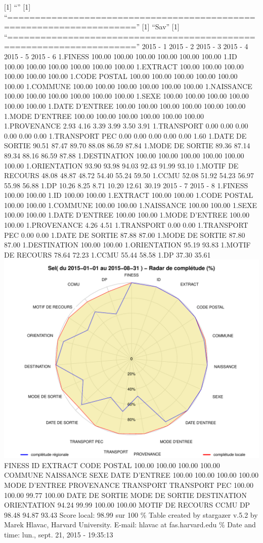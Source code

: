 \documentclass[]{article}
\begin{document}
{[}1{]} ``'' {[}1{]}
``=====================================================================''
{[}1{]} ``Sav'' {[}1{]}
``=====================================================================''
2015 - 1 2015 - 2 2015 - 3 2015 - 4 2015 - 5 2015 - 6 1.FINESS 100.00
100.00 100.00 100.00 100.00 100.00 1.ID 100.00 100.00 100.00 100.00
100.00 100.00 1.EXTRACT 100.00 100.00 100.00 100.00 100.00 100.00 1.CODE
POSTAL 100.00 100.00 100.00 100.00 100.00 100.00 1.COMMUNE 100.00 100.00
100.00 100.00 100.00 100.00 1.NAISSANCE 100.00 100.00 100.00 100.00
100.00 100.00 1.SEXE 100.00 100.00 100.00 100.00 100.00 100.00 1.DATE
D'ENTREE 100.00 100.00 100.00 100.00 100.00 100.00 1.MODE D'ENTREE
100.00 100.00 100.00 100.00 100.00 100.00 1.PROVENANCE 2.93 4.16 3.39
3.99 3.50 3.91 1.TRANSPORT 0.00 0.00 0.00 0.00 0.00 0.00 1.TRANSPORT PEC
0.00 0.00 0.00 0.00 0.00 1.60 1.DATE DE SORTIE 90.51 87.47 89.70 88.08
86.59 87.84 1.MODE DE SORTIE 89.36 87.14 89.34 88.16 86.59 87.88
1.DESTINATION 100.00 100.00 100.00 100.00 100.00 100.00 1.ORIENTATION
93.90 93.98 94.03 92.43 91.99 93.10 1.MOTIF DE RECOURS 48.08 48.87 48.72
54.40 55.24 59.50 1.CCMU 52.08 51.92 54.23 56.97 55.98 56.88 1.DP 10.26
8.25 8.71 10.20 12.61 30.19 2015 - 7 2015 - 8 1.FINESS 100.00 100.00
1.ID 100.00 100.00 1.EXTRACT 100.00 100.00 1.CODE POSTAL 100.00 100.00
1.COMMUNE 100.00 100.00 1.NAISSANCE 100.00 100.00 1.SEXE 100.00 100.00
1.DATE D'ENTREE 100.00 100.00 1.MODE D'ENTREE 100.00 100.00 1.PROVENANCE
4.26 4.51 1.TRANSPORT 0.00 0.00 1.TRANSPORT PEC 0.00 0.00 1.DATE DE
SORTIE 87.88 87.00 1.MODE DE SORTIE 87.80 87.00 1.DESTINATION 100.00
100.00 1.ORIENTATION 95.19 93.83 1.MOTIF DE RECOURS 78.64 72.23 1.CCMU
55.44 58.58 1.DP 37.30 35.61
\includegraphics{completude_files/figure-latex/finess-2.pdf} FINESS ID
EXTRACT CODE POSTAL 100.00 100.00 100.00 100.00 COMMUNE NAISSANCE SEXE
DATE D'ENTREE 100.00 100.00 100.00 100.00 MODE D'ENTREE PROVENANCE
TRANSPORT TRANSPORT PEC 100.00 100.00 99.77 100.00 DATE DE SORTIE MODE
DE SORTIE DESTINATION ORIENTATION 94.24 99.99 100.00 100.00 MOTIF DE
RECOURS CCMU DP 98.48 94.87 93.43 Score local: 98.99 sur 100 \% Table
created by stargazer v.5.2 by Marek Hlavac, Harvard University. E-mail:
hlavac at fas.harvard.edu \% Date and time: lun., sept. 21, 2015 -
19:35:13
\end{document}
